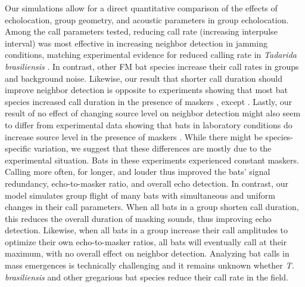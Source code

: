 \documentclass[
]{book}
\begin{document}
Our simulations allow for a direct quantitative comparison of the effects of echolocation, group geometry, and acoustic parameters in group echolocation. Among the call parameters tested, reducing call rate (increasing interpulse interval) was most effective in increasing neighbor detection in jamming conditions, matching experimental evidence for reduced calling rate in \emph{Tadarida brasiliensis} \citep{jarvis2013a, adams2017a}. In contrast, other FM bat species increase their call rates in groups and background noise\citep{amichai2015a, lin2016a, cvikel2015b, luo2015a}. Likewise, our result that shorter call duration should improve neighbor detection is opposite to experiments showing that most bat species increased call duration in the presence of maskers \citep{amichai2015a, tressler2009context, m1989a, luo2015a, hase2016a}, except \citep{cvikel2015b}. Lastly, our result of no effect of changing source level on neighbor detection might also seem to differ from experimental data showing that bats in laboratory conditions do increase source level in the presence of maskers \citep{amichai2015a, tressler2009context, luo2015a, hase2016a}. While there might be species-specific variation, we suggest that these differences are mostly due to the experimental situation. Bats in these experiments experienced constant maskers. Calling more often, for longer, and louder thus improved the bats' signal redundancy, echo-to-masker ratio, and overall echo detection. In contrast, our model simulates group flight of many bats with simultaneous and uniform changes in their call parameters. When all bats in a group shorten call duration, this reduces the overall duration of masking sounds, thus improving echo detection. Likewise, when all bats in a group increase their call amplitudes to optimize their own echo-to-masker ratios, all bats will eventually call at their maximum, with no overall effect on neighbor detection. Analyzing bat calls in mass emergences is technically challenging and it remains unknown whether \emph{T. brasiliensis} and other gregarious bat species reduce their call rate in the field.
\end{document}

